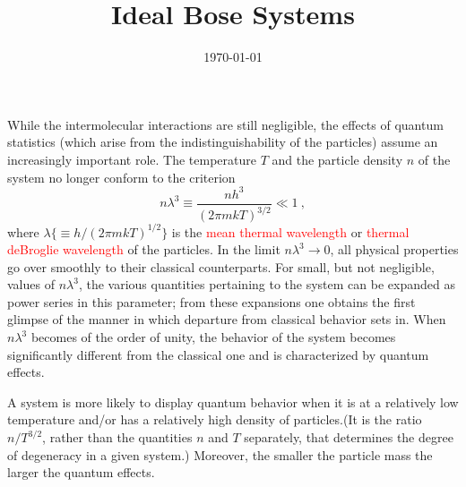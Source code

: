 \documentclass[12pt,a4paper]{article}
\title{Ideal Bose Systems}
\author{}
\date{\today}
\begin{document}
\maketitle

While the intermolecular interactions are still negligible, the effects of quantum statistics (which arise from the indistinguishability of the particles) assume an increasingly important role. The temperature $T$ and the particle density $n$ of the system no longer conform to the criterion
\begin{equation}
n \lambda^3 \equiv \frac{nh^3}{(2\pi m kT)^{3/2}} \ll 1 ~,
\end{equation}
where $\lambda\{\equiv h/(2\pi mkT)^{1/2} \}$ is the \textcolor{red}{mean thermal wavelength} or \textcolor{red}{thermal deBroglie wavelength} of the particles. In the limit $n \lambda^3 \rightarrow 0$, all physical properties go over smoothly to their classical counterparts. For small, but not negligible, values of $n \lambda^3$, the various quantities pertaining to the system can be expanded as power series in this parameter; from these expansions one obtains the first glimpse of the manner in which departure from classical behavior sets in. When $n \lambda^3$ becomes of the order of unity, the behavior of the system becomes significantly different from the classical one and is characterized by quantum effects. 

A system is more likely to display quantum behavior when it is at a relatively low temperature and/or has a relatively high density of particles.(It is the ratio $n/T^{3/2}$, rather than the quantities $n$ and $T$ separately, that determines the degree of degeneracy in a given system.) Moreover, the smaller the particle mass the larger the quantum effects.
\end{document}
